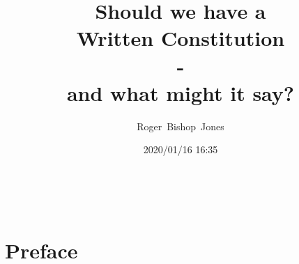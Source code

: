 \documentclass[14pt,titlepage]{extarticle}
\title{\LARGE \bf Should we have a \\Written Constitution \\- \\and what might it say?}
\author{Roger~Bishop~Jones}
\date{2020/01/16 16:35}
\newcommand{\ignore}[1]{}
\begin{document}

                               
\begin{titlepage}
\maketitle





\end{titlepage}

\ \

\ignore{
\begin{centering}
{\LARGE \bf Should we have a \\Written Constitution?\\ - \\and what might it say?\\}
\end{centering}
}%

\setcounter{tocdepth}{2}
{\parskip-0pt\tableofcontents}




\section*{Preface}
\end{document}
